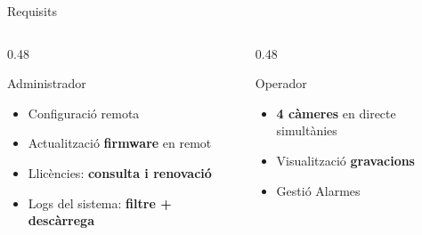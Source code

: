 \begin{frame}{Requisits}

  \begin{columns}[T]
    \begin{column}{0.48\textwidth}
      \begin{block}{Administrador}
        \begin{itemize}
          \item[\small$\bullet$] Configuració remota
          \item[\small$\bullet$] Actualització \textbf{firmware} en remot
          \item[\small$\bullet$] Llicències: \textbf{consulta i renovació}
          \item[\small$\bullet$] Logs del sistema: \textbf{filtre + descàrrega}
        \end{itemize}
      \end{block}
    \end{column}

    \begin{column}{0.48\textwidth}
      \begin{block}{Operador}
        \begin{itemize}
          \item[\small$\bullet$] \textbf{4 càmeres} en directe simultànies
          \item[\small$\bullet$] Visualització \textbf{gravacions}
          \item[\small$\bullet$] Gestió Alarmes 
        \end{itemize}
      \end{block}
    \end{column}
  \end{columns}
\end{frame}

